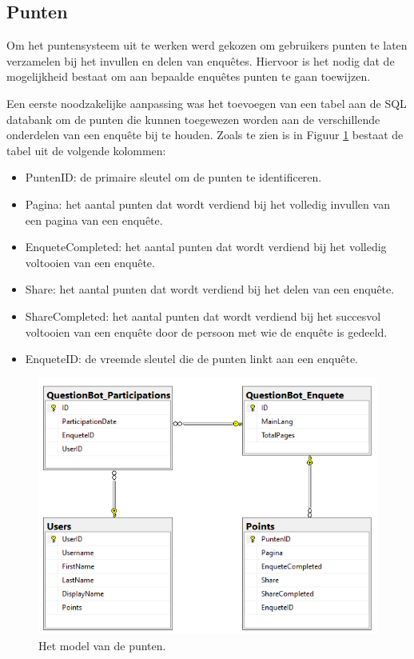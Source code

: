 \subsection{Punten}

Om het puntensysteem uit te werken werd gekozen om gebruikers punten te laten verzamelen bij het invullen en delen van enquêtes. Hiervoor is het nodig dat de mogelijkheid bestaat om aan bepaalde enquêtes punten te gaan toewijzen.

Een eerste noodzakelijke aanpassing was het toevoegen van een tabel aan de SQL databank om de punten die kunnen toegewezen worden aan de verschillende onderdelen van een enquête bij te houden. Zoals te zien is in Figuur \ref{fig:dbdiagram} bestaat de tabel uit de volgende kolommen:

\begin{itemize}
    \item PuntenID: de primaire sleutel om de punten te identificeren.
    \item Pagina: het aantal punten dat wordt verdiend bij het volledig invullen van een pagina van een enquête.
    \item EnqueteCompleted: het aantal punten dat wordt verdiend bij het volledig voltooien van een enquête.
    \item Share: het aantal punten dat wordt verdiend bij het delen van een enquête.
    \item ShareCompleted: het aantal punten dat wordt verdiend bij het succesvol voltooien van een enquête door de persoon met wie de enquête is gedeeld.
    \item EnqueteID: de vreemde sleutel die de punten linkt aan een enquête.
\end{itemize}

\begin{figure}
    \includegraphics[width=\linewidth]{DBDiagram.png}
    \caption{Het model van de punten.}
    \label{fig:dbdiagram}
\end{figure}

